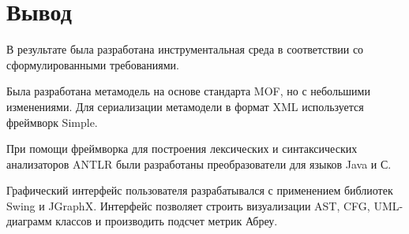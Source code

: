 \section{Вывод}

В результате была разработана инструментальная среда в соответствии со
сформулированными требованиями.

Была разработана метамодель на основе стандарта MOF, но с небольшими изменениями.
Для сериализации метамодели в формат XML используется фреймворк Simple.

При помощи фреймворка для построения лексических и синтаксических анализаторов
ANTLR были разработаны преобразователи для языков Java и С.

Графический интерфейс пользователя разрабатывался с применением библиотек Swing
и JGraphX. Интерфейс позволяет строить визуализации AST, CFG, UML-диаграмм
классов и производить подсчет метрик Абреу.
